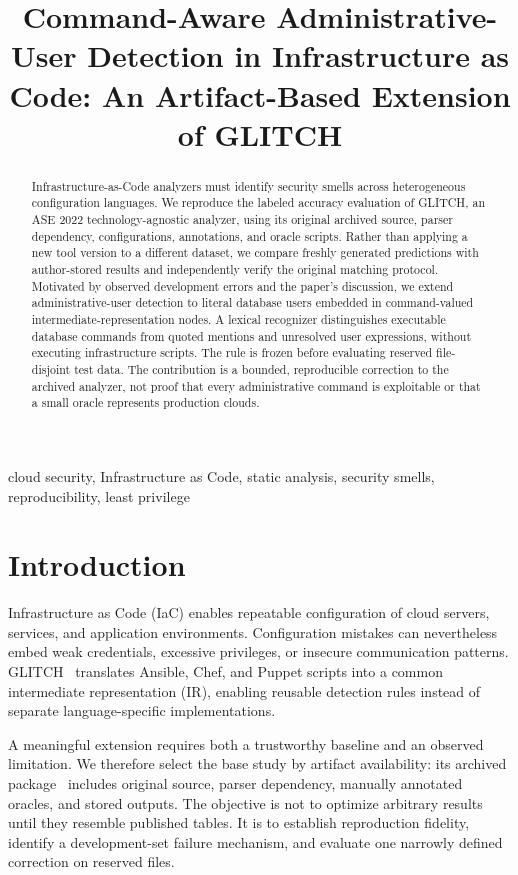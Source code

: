 \documentclass[conference]{IEEEtran}
\title{Command-Aware Administrative-User Detection in Infrastructure as Code: An Artifact-Based Extension of GLITCH}
\author{\IEEEauthorblockN{Simone Rodrigues}
\IEEEauthorblockA{IIIT Dharwad\\Dharwad, India\\simonerodrigues12159@gmail.com}}
\begin{document}
\maketitle
\begin{abstract}
Infrastructure-as-Code analyzers must identify security smells across heterogeneous configuration languages. We reproduce the labeled accuracy evaluation of GLITCH, an ASE 2022 technology-agnostic analyzer, using its original archived source, parser dependency, configurations, annotations, and oracle scripts. Rather than applying a new tool version to a different dataset, we compare freshly generated predictions with author-stored results and independently verify the original matching protocol. \BaselineAbstract{}
Motivated by observed development errors and the paper's discussion, we extend administrative-user detection to literal database users embedded in command-valued intermediate-representation nodes. A lexical recognizer distinguishes executable database commands from quoted mentions and unresolved user expressions, without executing infrastructure scripts. The rule is frozen before evaluating reserved file-disjoint test data. \ExtensionAbstract{}
The contribution is a bounded, reproducible correction to the archived analyzer, not proof that every administrative command is exploitable or that a small oracle represents production clouds.
\end{abstract}
\begin{IEEEkeywords}
cloud security, Infrastructure as Code, static analysis, security smells, reproducibility, least privilege
\end{IEEEkeywords}

\section{Introduction}
Infrastructure as Code (IaC) enables repeatable configuration of cloud servers, services, and application environments. Configuration mistakes can nevertheless embed weak credentials, excessive privileges, or insecure communication patterns. GLITCH~\cite{glitch2022} translates Ansible, Chef, and Puppet scripts into a common intermediate representation (IR), enabling reusable detection rules instead of separate language-specific implementations.

A meaningful extension requires both a trustworthy baseline and an observed limitation. We therefore select the base study by artifact availability: its archived package~\cite{artifact} includes original source, parser dependency, manually annotated oracles, and stored outputs. The objective is not to optimize arbitrary results until they resemble published tables. It is to establish reproduction fidelity, identify a development-set failure mechanism, and evaluate one narrowly defined correction on reserved files.
\end{document}
